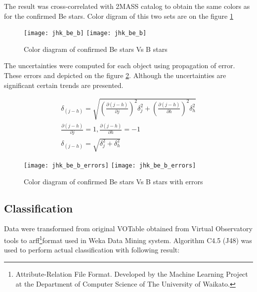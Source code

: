 The result was cross-correlated with 2MASS catalog to obtain the same
colors as for the confirmed Be stars. Color digram of this two sets
are on the figure \ref{Figjhk_be_b}

    \begin{figure}[!htbp]
      \begin{center}
        \leavevmode
        \ifpdf
        \texttt{[image: jhk\_be\_b]}
        \else
        \texttt{[image: jhk\_be\_b]}
        \fi
        \caption{Color diagram of confirmed Be stars Vs B stars}
        \label{Figjhk_be_b}
      \end{center}
    \end{figure}

    The uncertainties were computed for each object using propagation
    of error. These errors and depicted on the figure
    \ref{Figjhk_be_b_errors}. Although the uncertainties are
    significant certain trends are presented.

\begin{align*}
  \delta_{(j - h)} = \sqrt{\left(\frac{\partial(j - h) }{\partial
        j}\right)^2\delta_j^2 + \left(\frac{\partial(j - h) }{\partial
        h}\right)^2\delta_h^2} \\
  \frac{\partial(j - h) }{\partial j } = 1,\frac{\partial(j - h)
  }{\partial h } = -1 \\
  \delta_{(j - h)} = \sqrt{\delta_j^2 + \delta_h^2}
\end{align*}


    \begin{figure}[!htbp]
      \begin{center}
        \leavevmode
        \ifpdf
        \texttt{[image: jhk\_be\_b\_errors]}
        \else
        \texttt{[image: jhk\_be\_b\_errors]}
        \fi
        \caption{Color diagram of confirmed Be stars Vs B stars with errors}
        \label{Figjhk_be_b_errors}
      \end{center}
    \end{figure}

\clearpage


\subsection{Classification}
Data were transformed from original VOTable obtained from Virtual
Observatory tools to arff\footnote{Attribute-Relation File
  Format. Developed by the Machine Learning Project at the Department
  of Computer Science of The University of Waikato.}format used in
Weka Data Mining system. Algorithm C4.5 (J48) was used to perform
actual classification with following result:

